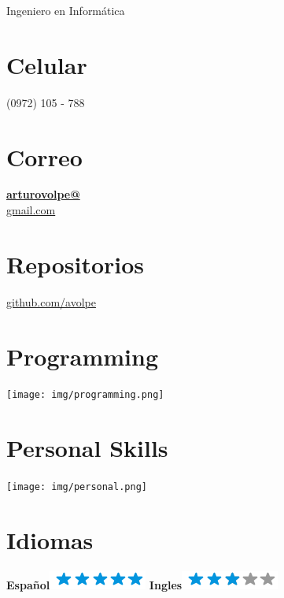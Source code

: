 \documentclass[]{friggeri-cv}
\begin{document}
{Ingeniero en Informática}


\begin{aside}
    \section{Celular}
        (0972) 105 - 788
        ~
    \section{Correo}
        \href{mailto:arturovolpe@gmail.com}{\textbf{arturovolpe@}\\gmail.com}
        ~
    \section{Repositorios}
        \href{https://github.com/avolpe}{github.com/avolpe}
        ~
  \section{Programming}
    \texttt{[image: img/programming.png]}
    ~
  \section{Personal Skills}
    \texttt{[image: img/personal.png]}
    ~
\section{Idiomas}
\textbf{Español}\includegraphics[scale=0.40]{img/5stars.png}
\textbf{Ingles}\includegraphics[scale=0.40]{img/3stars.png}
\end{aside}
\end{document}
